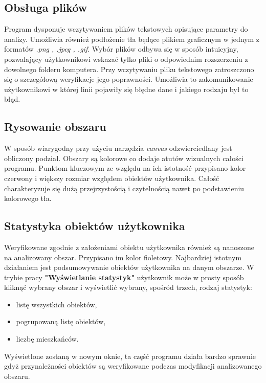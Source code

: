 \documentclass[a4paper,11pt]{article}
\begin{document}
\subsection{Obsługa plików}
Program dysponuje wczytywaniem plików tekstowych opisujące parametry do analizy. Umożliwia również podłożenie tła będące plikiem graficznym w jednym z formatów \textit{.png , .jpeg , .gif}. Wybór plików odbywa się w sposób intuicyjny, pozwalający użytkownikowi wskazać tylko pliki o odpowiednim rozszerzeniu z dowolnego folderu komputera. Przy wczytywaniu pliku tekstowego zatroszczono się o szczegółową weryfikacje jego poprawności. Umożliwia to zakomunikowanie użytkownikowi w której linii pojawiły się błędne dane i jakiego rodzaju był to błąd.
\subsection{Rysowanie obszaru}
W sposób wiarygodny przy użyciu narzędzia \textit{canvas} odzwierciedlany jest obliczony podział. Obszary są kolorowe co dodaje atutów wizualnych całości programu. Punktom kluczowym ze względu na ich istotność przypisano kolor czerwony i większy rozmiar względem obiektów użytkownika. Całość charakteryzuje się dużą przejrzystością i czytelnością nawet po podstawieniu kolorowego tła.
\subsection{Statystyka obiektów użytkownika}
Weryfikowane zgodnie z założeniami obiektu użytkownika również są nanoszone na analizowany obszar. Przypisano im kolor fioletowy. Najbardziej istotnym działaniem jest podsumowywanie obiektów użytkownika na danym obszarze. W trybie pracy \textbf{"Wyświetlanie statystyk"} użytkownik może w prosty sposób kliknąć wybrany obszar i wyświetlić wybrany, spośród trzech, rodzaj statystyk:
\begin{itemize}
\item listę wszystkich obiektów,
\item pogrupowaną listę obiektów,
\item liczbę mieszkańców.
\end{itemize}
Wyświetlone zostaną w nowym oknie, ta część programu działa bardzo sprawnie gdyż przynależności obiektów są weryfikowane podczas modyfikacji analizowanego obszaru.
\end{document}
